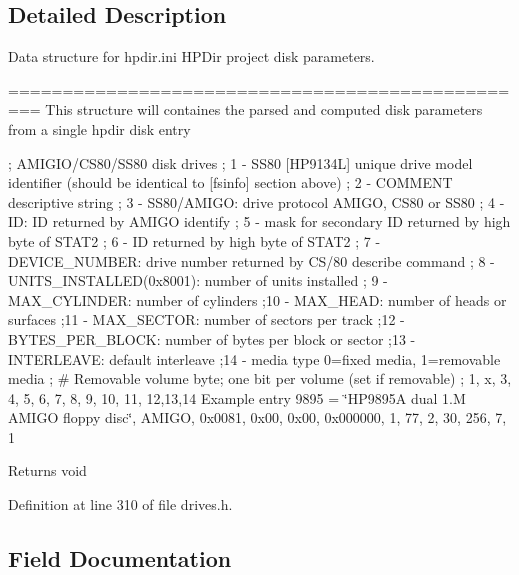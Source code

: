 \subsection{Detailed Description}
Data structure for hpdir.\+ini H\+P\+Dir project disk parameters. 

================================================= This structure will containes the parsed and computed disk parameters from a single hpdir disk entry

; A\+M\+I\+G\+I\+O/\+C\+S80/\+S\+S80 disk drives ; 1 -\/ S\+S80 \mbox{[}H\+P9134L\mbox{]} unique drive model identifier (should be identical to \mbox{[}fsinfo\mbox{]} section above) ; 2 -\/ C\+O\+M\+M\+E\+NT descriptive string ; 3 -\/ S\+S80/\+A\+M\+I\+GO\+: drive protocol A\+M\+I\+GO, C\+S80 or S\+S80 ; 4 -\/ ID\+: ID returned by A\+M\+I\+GO identify ; 5 -\/ mask for secondary ID returned by high byte of S\+T\+A\+T2 ; 6 -\/ ID returned by high byte of S\+T\+A\+T2 ; 7 -\/ D\+E\+V\+I\+C\+E\+\_\+\+N\+U\+M\+B\+ER\+: drive number returned by C\+S/80 describe command ; 8 -\/ U\+N\+I\+T\+S\+\_\+\+I\+N\+S\+T\+A\+L\+L\+E\+D(0x8001)\+: number of units installed ; 9 -\/ M\+A\+X\+\_\+\+C\+Y\+L\+I\+N\+D\+ER\+: number of cylinders ;10 -\/ M\+A\+X\+\_\+\+H\+E\+AD\+: number of heads or surfaces ;11 -\/ M\+A\+X\+\_\+\+S\+E\+C\+T\+OR\+: number of sectors per track ;12 -\/ B\+Y\+T\+E\+S\+\_\+\+P\+E\+R\+\_\+\+B\+L\+O\+CK\+: number of bytes per block or sector ;13 -\/ I\+N\+T\+E\+R\+L\+E\+A\+VE\+: default interleave ;14 -\/ media type 0=fixed media, 1=removable media ; \# Removable volume byte; one bit per volume (set if removable) ; 1, x, 3, 4, 5, 6, 7, 8, 9, 10, 11, 12,13,14 Example entry 9895 = \char`\"{}\+H\+P9895\+A dual 1.\+M A\+M\+I\+G\+O floppy disc\char`\"{}, A\+M\+I\+GO, 0x0081, 0x00, 0x00, 0x000000, 1, 77, 2, 30, 256, 7, 1

\begin{DoxyReturn}{Returns}
void 
\end{DoxyReturn}


Definition at line 310 of file drives.\+h.



\subsection{Field Documentation}
\mbox{\label{structhpdir__t_a4b4f32c9b9cfe558ce5fbd51d65b5db3}} 
